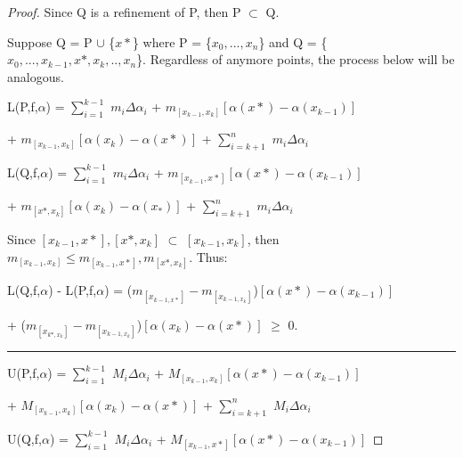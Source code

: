     \begin{proof}
        Since Q is a refinement of P, then P $\subset$ Q.
        
        Suppose Q = P $\cup$ \{$x*$\} where
        P = \{$x_0,...,x_n$\} and Q = \{$x_0,...,x_{k-1},x*,x_k,..,x_n$\}.
        Regardless of anymore points, the process below will be analogous.

        \hspace{0.5cm}
        L(P,f,$\alpha$)
        = $\sum_{i=1}^{k-1}$ $m_i \Delta \alpha_i$
        + $m_{[x_{k-1},x_k]} [\alpha(x*) - \alpha(x_{k-1})]$
        
        \hspace{5.1cm}
        + $m_{[x_{k-1},x_k]} [\alpha(x_k) - \alpha(x*)]$
        + $\sum_{i=k+1}^n$ $m_i \Delta \alpha_i$

        \hspace{0.5cm}
        L(Q,f,$\alpha$)
        = $\sum_{i=1}^{k-1}$ $m_i \Delta \alpha_i$
        + $m_{[x_{k-1},x*]} [\alpha(x*) - \alpha(x_{k-1})]$

        \hspace{5.1cm}
        + $m_{[x*,x_k]} [\alpha(x_k) - \alpha(x_*)]$
        + $\sum_{i=k+1}^n$ $m_i \Delta \alpha_i$

        \hspace{0.5cm}
        Since $[x_{k-1},x*],[x*,x_k]$ $\subset$ $[x_{k-1},x_k]$, then
        $m_{[x_{k-1},x_k]} \leq m_{[x_{k-1},x*]}, m_{[x*,x_k]}$.
        Thus:

        \hspace{0.5cm}
        L(Q,f,$\alpha$) - L(P,f,$\alpha$)
        = ($m_{[x_{k-1,x*}]} - m_{[x_{k-1,x_k}]}$)$[\alpha(x*) - \alpha(x_{k-1})]$

        \hspace{4.5cm}
        + ($m_{[x_{k*,x_k}]} - m_{[x_{k-1,x_k}]}$)$[\alpha(x_k) - \alpha(x*)]$
        $\geq$ 0.

        \rule[0.1cm]{15cm}{0.01cm}

        \hspace{0.5cm}
        U(P,f,$\alpha$)
        = $\sum_{i=1}^{k-1}$ $M_i \Delta \alpha_i$
        + $M_{[x_{k-1},x_k]} [\alpha(x*) - \alpha(x_{k-1})]$
        
        \hspace{5.1cm}
        + $M_{[x_{k-1},x_k]} [\alpha(x_k) - \alpha(x*)]$
        + $\sum_{i=k+1}^n$ $M_i \Delta \alpha_i$

        \hspace{0.5cm}
        U(Q,f,$\alpha$)
        = $\sum_{i=1}^{k-1}$ $M_i \Delta \alpha_i$
        + $M_{[x_{k-1},x*]} [\alpha(x*) - \alpha(x_{k-1})]$


\end{proof}
